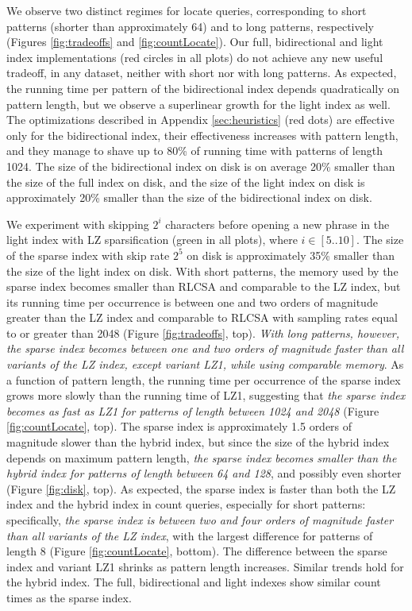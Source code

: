\documentclass[a4paper,UKenglish]{lipics-v2016}
\begin{document}
We observe two distinct regimes for locate queries, corresponding to short patterns (shorter than approximately 64) and to long patterns, respectively (Figures \ref{fig:tradeoffs} and \ref{fig:countLocate}). Our full, bidirectional and light index implementations (red circles in all plots) do not achieve any new useful tradeoff, in any dataset, neither with short nor with long patterns. As expected, the running time per pattern of the bidirectional index depends quadratically on pattern length, but we observe a superlinear growth for the light index as well. The optimizations described in Appendix \ref{sec:heuristics} (red dots) are effective only for the bidirectional index, their effectiveness increases with pattern length, and they manage to shave up to 80\% of running time with patterns of length 1024. The size of the bidirectional index on disk is on average 20\% smaller than the size of the full index on disk, and the size of the light index on disk is approximately 20\% smaller than the size of the bidirectional index on disk.

We experiment with skipping $2^i$ characters before opening a new phrase in the light index with LZ sparsification (green in all plots), where $i \in [5..10]$. The size of the sparse index with skip rate $2^5$ on disk is approximately 35\% smaller than the size of the light index on disk. With short patterns, the memory used by the sparse index becomes smaller than RLCSA and comparable to the LZ index, but its running time per occurrence is between one and two orders of magnitude greater than the LZ index and comparable to RLCSA with sampling rates equal to or greater than 2048 (Figure \ref{fig:tradeoffs}, top). \emph{With long patterns, however, the sparse index becomes between one and two orders of magnitude faster than all variants of the LZ index, except variant LZ1, while using comparable memory}. As a function of pattern length, the running time per occurrence of the sparse index grows more slowly than the running time of LZ1, suggesting that \emph{the sparse index becomes as fast as LZ1 for patterns of length between 1024 and 2048} (Figure \ref{fig:countLocate}, top). The sparse index is approximately 1.5 orders of magnitude slower than the hybrid index, but since the size of the hybrid index depends on maximum pattern length, \emph{the sparse index becomes smaller than the hybrid index for patterns of length between 64 and 128}, and possibly even shorter (Figure \ref{fig:disk}, top). As expected, the sparse index is faster than both the LZ index and the hybrid index in count queries, especially for short patterns: specifically, \emph{the sparse index is between two and four orders of magnitude faster than all variants of the LZ index}, with the largest difference for patterns of length 8 (Figure \ref{fig:countLocate}, bottom). The difference between the sparse index and variant LZ1 shrinks as pattern length increases. Similar trends hold for the hybrid index. The full, bidirectional and light indexes show similar count times as the sparse index.
\end{document}
